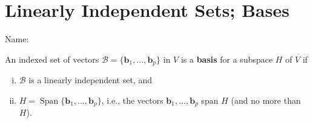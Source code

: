 \documentclass[10pt]{book}
\newcommand{\boxcolor}{gray!30}
\newenvironment{boxdef}{\begin{mdframed}[backgroundcolor=\boxcolor,linewidth=0pt,nobreak=true]}{\end{mdframed}}
\theoremstyle{definition}
\newcommand{\name}[1][2.5in]{\vspace{-2.3em}\hfill Name: \underline{\hspace{#1}}}
\newcommand{\B}{\mathscr{B}}
\newcommand{\vect}[1]{\ensuremath{\boldsymbol{\mathbf{#1}}}}
\DeclareMathOperator{\Span}{Span}
\newcommand{\vectset}[3][v]{\{\vect{#1}_{#2},\ldots,\vect{#1}_{#3}\}}
\begin{document}


\newpage


\setcounter{section}{0}




\setcounter{section}{2}
\section{Linearly Independent Sets; Bases}
\name[2in]


\begin{boxdef}
An indexed set of vectors $\B=\vectset[b]{1}{p}$ in $V$ is a \textbf{basis} for a subspace $H$ of $V$ if
\begin{enumerate}[(i)]
	\item $\B$ is a linearly independent set, and
	\item $H=\Span\vectset[b]{1}{p}$, i.e., the vectors $\vect{b}_1,\ldots,\vect{b}_p$ span $H$ (and no more than $H$).
\end{enumerate}
\end{boxdef}
\end{document}
